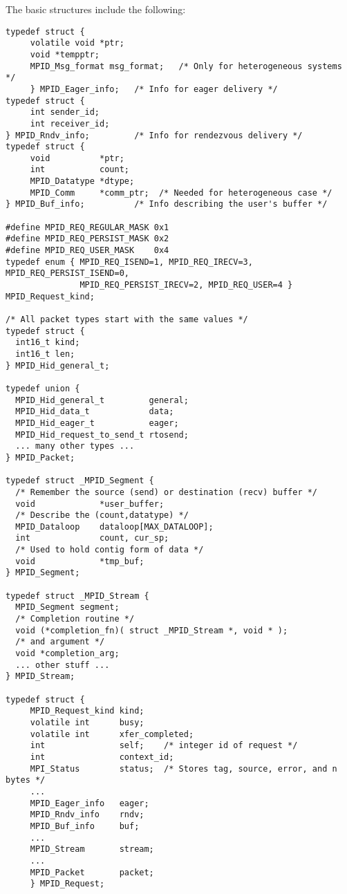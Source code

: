 The basic structures include the following:
\begin{verbatim}
typedef struct { 
     volatile void *ptr;
     void *tempptr;
     MPID_Msg_format msg_format;   /* Only for heterogeneous systems */
     } MPID_Eager_info;   /* Info for eager delivery */
typedef struct { 
     int sender_id;
     int receiver_id;
} MPID_Rndv_info;         /* Info for rendezvous delivery */
typedef struct {
     void          *ptr;
     int           count;
     MPID_Datatype *dtype;
     MPID_Comm     *comm_ptr;  /* Needed for heterogeneous case */
} MPID_Buf_info;          /* Info describing the user's buffer */

#define MPID_REQ_REGULAR_MASK 0x1
#define MPID_REQ_PERSIST_MASK 0x2
#define MPID_REQ_USER_MASK    0x4
typedef enum { MPID_REQ_ISEND=1, MPID_REQ_IRECV=3, MPID_REQ_PERSIST_ISEND=0,
               MPID_REQ_PERSIST_IRECV=2, MPID_REQ_USER=4 } MPID_Request_kind;

/* All packet types start with the same values */
typedef struct {
  int16_t kind;
  int16_t len;
} MPID_Hid_general_t;

typedef union {
  MPID_Hid_general_t         general;
  MPID_Hid_data_t            data;
  MPID_Hid_eager_t           eager;
  MPID_Hid_request_to_send_t rtosend;
  ... many other types ...
} MPID_Packet;

typedef struct _MPID_Segment {
  /* Remember the source (send) or destination (recv) buffer */
  void             *user_buffer;
  /* Describe the (count,datatype) */
  MPID_Dataloop    dataloop[MAX_DATALOOP];
  int              count, cur_sp;
  /* Used to hold contig form of data */
  void             *tmp_buf;  
} MPID_Segment;

typedef struct _MPID_Stream {
  MPID_Segment segment;
  /* Completion routine */
  void (*completion_fn)( struct _MPID_Stream *, void * );
  /* and argument */
  void *completion_arg;
  ... other stuff ...
} MPID_Stream;

typedef struct {
     MPID_Request_kind kind;
     volatile int      busy;
     volatile int      xfer_completed;
     int               self;    /* integer id of request */
     int               context_id;
     MPI_Status        status;  /* Stores tag, source, error, and n bytes */
     ...
     MPID_Eager_info   eager;
     MPID_Rndv_info    rndv;
     MPID_Buf_info     buf;
     ...
     MPID_Stream       stream;
     ...
     MPID_Packet       packet;
     } MPID_Request;
\end{verbatim}

